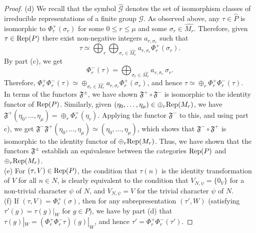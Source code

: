 \documentclass[reqno]{amsart}
\theoremstyle{definition}
\theoremstyle{remark}
\numberwithin{equation}{section}
\newcommand{\mG}{\mathcal G} \newcommand{\mN}{\mathcal N} \newcommand{\mM}{\mathcal M} \newcommand{\mU}{\mathcal U}
\newcommand{\fF}{\mathfrak F}
\begin{document}
\begin{proof}
(d) We recall that the symbol $\widehat{\mG}$ denotes the set of isomorphism classes of irreducible representations of a finite group $\mG$. As observed above, any $\tau \in \widehat{P}$  is isomorphic to $\Phi_r^+(\sigma_r)$ for some $0 \leq r \leq \mu$ and some $\sigma_r \in \widehat{M_r}$. Therefore, given $\tau \in  {\rm Rep}(P)$ there exist non-negative integers $a_{r, \sigma_r}$ such that 
\[\tau \simeq \bigoplus_r  \bigoplus_{ \sigma_r \in \widehat{M_r}} a_{r, \sigma_r} \Phi_r^+(\sigma_r).\]
By part (c), we get 
\[ \Phi_r^-(\tau)= \bigoplus_{ \sigma_r \in \widehat{M_r}} a_{r, \sigma_r} \, \sigma_r.\]
Therefore, $\Phi_r^+ \Phi_r^-(\tau) \simeq \oplus_{\sigma_r \in \widehat{M_r}} a_{r,\sigma_r} \Phi_r^+(\sigma_r)$, and hence  $\tau \simeq  \oplus_r \Phi_r^+ \Phi_r^-(\tau)$.\\

In terms of the functors $\fF^{\pm}$, we have shown $\fF^+ \circ \fF^-$ is isomorphic to the identity functor of 
${\rm Rep}(P)$. Similarly, given $(\eta_0, \dots, \eta_\mu) \in \oplus_r {\rm Rep}(M_r)$, we  have  $\fF^+(\eta_0, \dots, \eta_\mu)=\oplus_r  \Phi_r^+(\eta_r)$. Applying the functor $\fF^-$ to this, and using part c), we get $\fF^- \fF^+(\eta_0, \dots, \eta_\mu) \simeq   (\eta_0, \dots, \eta_\mu)$, which shows that $\fF^- \circ \fF^+$ is isomorphic to the identity functor of $\oplus_r {\rm Rep}(M_r)$. Thus, we have shown that the functors $\fF^{\pm}$ establish an equivalence between the categories  $ {\rm Rep}(P)$ and $\oplus_r {\rm Rep}(M_r)$.\\

(e) For $(\tau,V) \in {\rm Rep}(P)$, the condition that $\tau(n)$ is the identity transformation of $V$ for all $n \in N$, is clearly equivalent to the condition that $V_{N, \psi} =\{0_V\}$ for a non-trivial character $\psi$ of $N$, and $V_{N, \psi}=V$ for the trivial character $\psi$ of $N$.\\

(f) If $(\tau,V)= \Phi_r^+(\sigma)$, then for any subrepresentation $(\tau', W)$ (satisfying $\tau'(g)=\tau(g)|_W$ for $g \in P$), we have by part (d) that $\tau(g)|_W =(\Phi_r^+ \Phi_r^- \tau)(g)|_W$, and hence $\tau'= \Phi_r^+ \Phi_r^-(\tau')$.
\end{proof}
\end{document}
